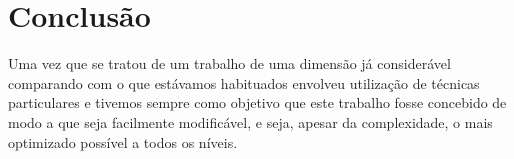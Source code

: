 \chapter{Conclusão}

Uma vez que se tratou de um trabalho de uma dimensão já considerável comparando com o que estávamos habituados envolveu utilização de técnicas particulares e tivemos sempre como objetivo que este trabalho fosse concebido de modo a que seja facilmente modificável, e seja, apesar da complexidade, o mais optimizado possível a todos os níveis.

